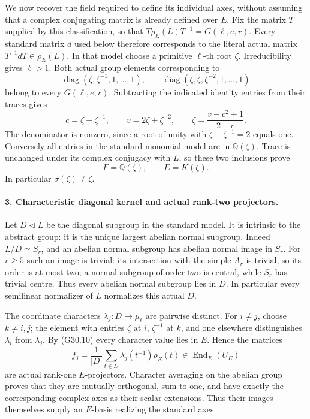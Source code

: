 We now recover the field required to define its individual
axes, without assuming that a complex conjugating matrix is
already defined over \(E\). Fix the matrix \(T\) supplied
by this classification, so that
\(T\rho_E(L)T^{-1}=G(\ell,e,r)\). Every standard
matrix \(d\) used below therefore corresponds to the
literal actual matrix \(T^{-1}dT\in\rho_E(L)\).
In that model choose a primitive \(\ell\)-th root \(\zeta\).
Irreducibility gives \(\ell>1\). Both actual group
elements corresponding to
\[
 \operatorname{diag}(\zeta,\zeta^{-1},1,\ldots,1),\qquad
 \operatorname{diag}(\zeta,\zeta,\zeta^{-2},1,\ldots,1)
                                                               \tag{G30.8}
\]
belong to every \(G(\ell,e,r)\). Subtracting the indicated
identity entries from their traces gives
\[
 c=\zeta+\zeta^{-1},\qquad v=2\zeta+\zeta^{-2},\qquad
           \zeta=\frac{v-c^2+1}{2-c}.                     \tag{G30.9}
\]
The denominator is nonzero, since a root of unity with
\(\zeta+\zeta^{-1}=2\) equals one. Conversely all entries
in the standard monomial model are in \(\mathbb Q(\zeta)\).
Trace is unchanged under its complex conjugacy with \(L\),
so these two inclusions prove
\[
             F=\mathbb Q(\zeta),\qquad E=K(\zeta).
                                                               \tag{G30.10}
\]
In particular \(\sigma(\zeta)\ne\zeta\).

\paragraph{3. Characteristic diagonal kernel and actual rank-two projectors.}
Let \(D\triangleleft L\) be the diagonal subgroup in
the standard model. It is intrinsic to the abstract group:
it is the unique largest abelian normal subgroup. Indeed
\(L/D\simeq S_r\), and an abelian normal subgroup has
abelian normal image in \(S_r\). For \(r\ge5\) such
an image is trivial: its intersection with the simple
\(A_r\) is trivial, so its order is at most two; a normal
subgroup of order two is central, while \(S_r\) has trivial
centre. Thus every abelian normal subgroup lies in \(D\).
In particular every semilinear normalizer of \(L\)
normalizes this actual \(D\).

The coordinate characters \(\lambda_j:D\to\mu_\ell\)
are pairwise distinct. For \(i\ne j\), choose
\(k\ne i,j\); the element with entries \(\zeta\)
at \(i\), \(\zeta^{-1}\) at \(k\), and one elsewhere
distinguishes \(\lambda_i\) from \(\lambda_j\).
By (G30.10) every character value lies in \(E\). Hence
the matrices
\[
 f_j=\frac1{|D|}\sum_{t\in D}\lambda_j(t^{-1})\rho_E(t)
                         \in\operatorname{End}_E(U_E)
                                                               \tag{G30.11}
\]
are actual rank-one \(E\)-projectors. Character averaging
on the abelian group proves that they are mutually orthogonal,
sum to one, and have exactly the corresponding complex axes
as their scalar extensions. Thus their images themselves
supply an \(E\)-basis realizing the standard axes.

